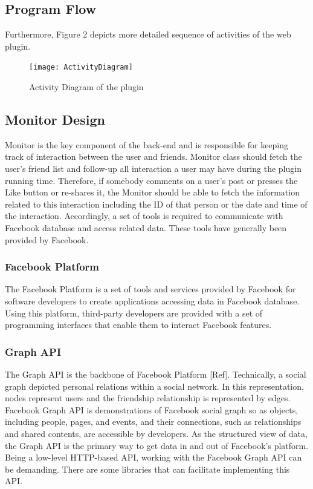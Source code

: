 \documentclass[a4paper,11pt]{article}
\begin{document}
\subsection{Program Flow}
\indent Furthermore, Figure 2 depicts more detailed sequence of activities of the web plugin. 

\begin{figure}[H]
	\centering
	\texttt{[image: ActivityDiagram]}
	\caption{Activity Diagram of the plugin}
\end{figure}

\subsection{Monitor Design} 

Monitor is the key component of the back-end and is responsible for keeping track of interaction between the user and friends. Monitor class should fetch the user’s friend list and follow-up all interaction a user may have during the plugin running time. Therefore, if somebody comments on a user’s post or presses the Like button or re-shares it, the Monitor should be able to fetch the information related to this interaction including the ID of that person or the date and time of the interaction. Accordingly, a set of tools is required to communicate with Facebook database and access related data. These tools have generally been provided by Facebook.

\subsubsection{Facebook Platform}

The Facebook Platform is a set of tools and services provided by Facebook for software developers to create applications accessing data in Facebook database. Using this platform, third-party developers are provided with a set of programming interfaces that enable them to interact Facebook features. 

\subsubsection{Graph API}
The Graph API is the backbone of Facebook Platform [Ref]. Technically, a social graph depicted personal relations within a social network. In this representation, nodes represent users and the friendship relationship is represented by edges.
\\
\indent Facebook Graph API is demonstrations of Facebook social graph so as objects, including people, pages, and events, and their connections, such as relationships and shared contents, are accessible by developers.  As the structured view of data, the Graph API is the primary way to get data in and out of Facebook’s platform.
\\
\indent Being a low-level HTTP-based API, working with the Facebook Graph API can be demanding. There are some libraries that can facilitate implementing this API. 
\end{document}
